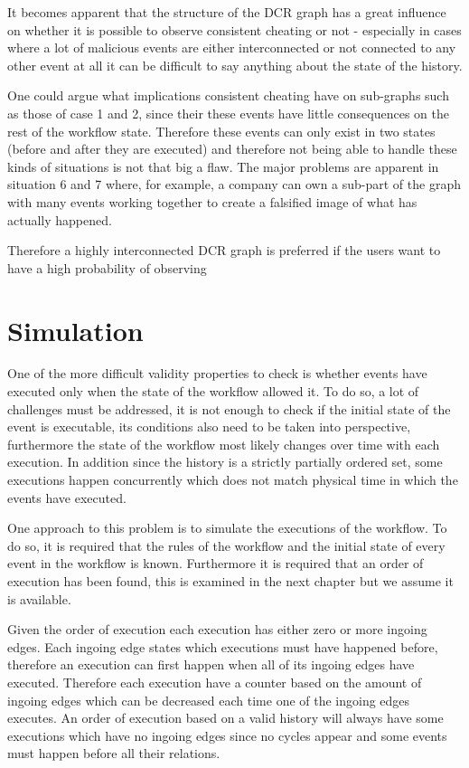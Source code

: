 	\newpar It becomes apparent that the structure of the DCR graph has a great influence on whether it is possible to observe consistent cheating or not - especially in cases where a lot of malicious events are either interconnected or not connected to any other event at all it can be difficult to say anything about the state of the history. 
	
	One could argue what implications consistent cheating have on sub-graphs such as those of case 1 and 2, since their these events have little consequences on the rest of the workflow state. Therefore these events can only exist in two states (before and after they are executed) and therefore not being able to handle these kinds of situations is not that big a flaw. The major problems are apparent in situation 6 and 7 where, for example, a company can own a sub-part of the graph with many events working together to create a falsified image of what has actually happened. 
	
	\newpar Therefore a highly interconnected DCR graph is preferred if the users want to have a high probability of observing  

    \section{Simulation}\label{sec:historyindcr:simulation}
    One of the more difficult validity properties to check is whether events have executed only when the state of the workflow allowed it. To do so, a lot of challenges must be addressed, it is not enough to check if the initial state of the event is executable, its conditions also need to be taken into perspective, furthermore the state of the workflow most likely changes over time with each execution. In addition since the history is a strictly partially ordered set, some executions happen concurrently which does not match physical time in which the events have executed.
    
    \newpar One approach to this problem is to simulate the executions of the workflow. To do so, it is required that the rules of the workflow and the initial state of every event in the workflow is known. Furthermore it is required that an order of execution has been found, this is examined in the next chapter but we assume it is available. 
    
    Given the order of execution each execution has either zero or more ingoing edges. Each ingoing edge states which executions must have happened before, therefore an execution can first happen when all of its ingoing edges have executed. Therefore each execution have a counter based on the amount of ingoing edges which can be decreased each time one of the ingoing edges executes. An order of execution based on a valid history will always have some executions which have no ingoing edges since no cycles appear and some events must happen before all their relations.
    
